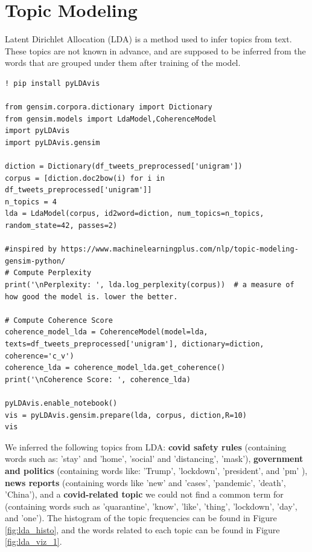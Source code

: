 \section*{Topic Modeling}
Latent Dirichlet Allocation (LDA) \cite{lda} is a method used to infer topics from text. These topics are not known in advance, and are supposed to be inferred from the words that are grouped under them after training of the model.

\begin{listing*}
\begin{verbatim}
! pip install pyLDAvis

from gensim.corpora.dictionary import Dictionary
from gensim.models import LdaModel,CoherenceModel
import pyLDAvis
import pyLDAvis.gensim

diction = Dictionary(df_tweets_preprocessed['unigram'])
corpus = [diction.doc2bow(i) for i in df_tweets_preprocessed['unigram']]
n_topics = 4
lda = LdaModel(corpus, id2word=diction, num_topics=n_topics, random_state=42, passes=2)

#inspired by https://www.machinelearningplus.com/nlp/topic-modeling-gensim-python/
# Compute Perplexity
print('\nPerplexity: ', lda.log_perplexity(corpus))  # a measure of how good the model is. lower the better.

# Compute Coherence Score
coherence_model_lda = CoherenceModel(model=lda, texts=df_tweets_preprocessed['unigram'], dictionary=diction, coherence='c_v')
coherence_lda = coherence_model_lda.get_coherence()
print('\nCoherence Score: ', coherence_lda)

pyLDAvis.enable_notebook()
vis = pyLDAvis.gensim.prepare(lda, corpus, diction,R=10)
vis

\end{verbatim}
\caption{}
\label{listing:pb-code1}
\end{listing*}


We inferred the following topics from LDA: \textbf{covid safety rules} (containing words such as: 'stay' and 'home', 'social' and 'distancing', 'mask'), \textbf{government and politics} (containing words like: 'Trump', 'lockdown', 'president', and 'pm' ), \textbf{news reports} (containing words like 'new' and 'cases', 'pandemic', 'death', 'China'), and a \textbf{covid-related topic} we could not find a common term for (containing words such as 'quarantine', 'know', 'like', 'thing', 'lockdown', 'day', and 'one'). The histogram of the topic frequencies can be found in Figure \ref{fig:lda_histo}, and the words related to each topic can be found in Figure \ref{fig:lda_viz_1}.

